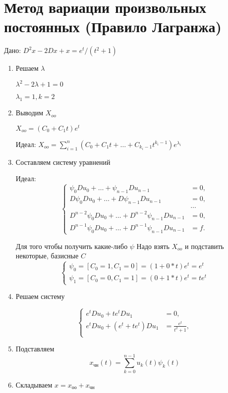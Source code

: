 \documentclass[a4paper, 12pt]{article}
\begin{document}
\section{Метод вариации произвольных постоянных (Правило Лагранжа)}
Дано: $D^2x-2Dx+x=e^t/(t^2+1)$
\begin{enumerate}
    \item Решаем $\lambda$

    $\lambda^2-2\lambda+1=0$
    
    $\lambda_1=1,k=2$
    \item Выводим $X_{oo}$
    
    $X_{oo}=(C_0+C_{1}t)e^{t}$

    Идеал: $X_{oo}=\sum_{i=1}^{n}(C_0+C_1t+\dots+C_{k_{i}-1}t^{k_i-1})e^{\lambda_i}$

    \item Составляем систему уравнений
    
    Идеал: 
    \[
\left\{
\begin{aligned}
    \psi_0 D u_0 + \dots + \psi_{n-1} D u_{n-1} &= 0, \\
    D \psi_0 D u_0 + \dots + D \psi_{n-1} D u_{n-1} &= 0, \\
    & \dots \\
    D^{n-2} \psi_0 D u_0 + \dots + D^{n-2} \psi_{n-1} D u_{n-1} &= 0, \\
    D^{n-1} \psi_0 D u_0 + \dots + D^{n-1} \psi_{n-1} D u_{n-1} &= f.
\end{aligned}
\right.
\]

Для того чтобы получить какие-либо $\psi$ Надо взять $X_{oo}$ и подставить некоторые, базисные $C$
\[
\left\{
\begin{aligned}
    \psi_0 = [C_0 = 1, C_1 = 0] = (1+0*t)e^{t} =  e^{t} \\
    \psi_1 = [C_0 = 0, C_1 = 1] = (0+1*t)e^{t} = te^{t}
\end{aligned}
\right.
\]
    \item Решаем систему
    
\[
\left\{
\begin{aligned}
    e^{t} D u_0 + te^{t} D u_{1} &= 0, \\
    e^{t} D u_0 + (e^{t}+te^{t}) D u_{1} &= \frac{e^{t}}{t^2+1}, \\
\end{aligned}
\right.
\]    

    \item Подставляем
    $$x_{\text{чн}}(t) = \sum_{k=0}^{n-1} u_k(t) \psi_k(t)$$
    \item Складываем
    $x=x_{\text{оо}}+x_{\text{чн}}$
\end{enumerate}
\newpage
\end{document}
